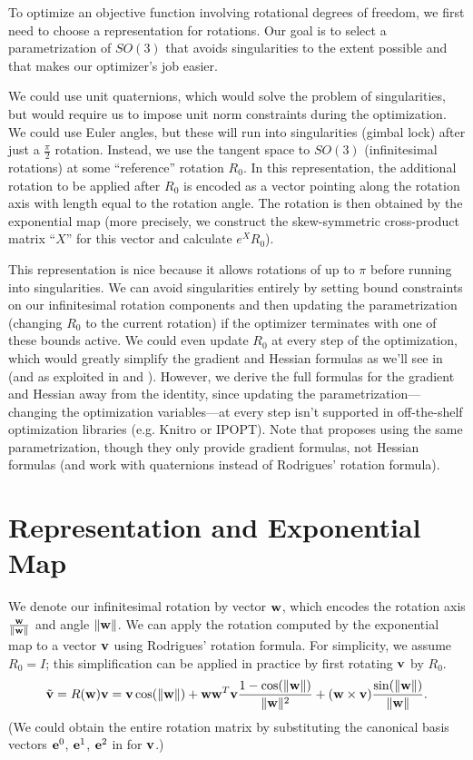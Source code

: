 \documentclass[10pt]{article}
\title{\documenttitle}
\author{Julian Panetta}
\providecommand{\norm}[1]{\lVert#1\rVert}
\providecommand{\cross}{\times}
\renewcommand{\vec}[1]{{\bf #1}}
\newcommand\pr[1]{\prettyref{#1}}
\def\w{\vec{w}}
\def\wn{\norm{\w}}
\def\v{\vec{v}}
\def\e{\vec{e}}
\begin{document}
\maketitle

To optimize an objective function involving rotational
degrees of freedom, we first need to choose a representation for rotations.
Our goal is to select a parametrization of $SO(3)$ that avoids
singularities to the extent possible and that makes our optimizer's job easier.

We could use unit quaternions, which would solve the problem
of singularities, but would require us to impose unit norm constraints during the optimization. We could
use Euler angles, but these will run into singularities (gimbal lock) after just
a $\frac{\pi}{2}$ rotation. Instead, we use the tangent space to $SO(3)$
(infinitesimal rotations) at some ``reference'' rotation $R_0$. In this representation, the additional
rotation to be applied after  $R_0$ is encoded as a vector pointing along the
rotation axis with length equal to the rotation angle. The rotation is then
obtained by the exponential map (more precisely, we construct the skew-symmetric cross-product matrix ``$X$'' for this
vector and calculate $e^X R_0$).

This representation is nice because it allows rotations of up to $\pi$ before
running into singularities. We can avoid singularities entirely by setting bound
constraints on our infinitesimal rotation components and then updating the
parametrization (changing $R_0$ to the current rotation) if the optimizer
terminates with one of these bounds active. We could even update $R_0$
at every step of the optimization, which would greatly
simplify the gradient and Hessian formulas as we'll see in \pr{sec:around_identity}
(and as exploited
in \cite{kugelstadt2018fast} and \cite{taylor1994minimization}). However, we
derive the full formulas for the gradient and Hessian away from the identity, since
updating the parametrization---changing the optimization variables---at every
step isn't supported in off-the-shelf optimization libraries (e.g. Knitro or
IPOPT). Note that \cite{grassia1998practical} proposes using the same
parametrization, though they only provide gradient formulas, not Hessian
formulas (and work with quaternions instead of Rodrigues' rotation formula).

\section{Representation and Exponential Map}
We denote our infinitesimal rotation by vector $\w$, which encodes the rotation axis $\frac{\w}{\norm{\w}}$
and angle $\norm{\w}$.
We can apply the rotation computed by the exponential map to a vector $\v$ using Rodrigues' rotation formula.
For simplicity, we assume $R_0 = I$; this simplification can be applied in practice by first rotating $\v$ by $R_0$.
$$
\tilde{\v} = R(\w) \v =
        \v \cos(\wn) + \w \w^T \v \frac{1 - \cos(\wn)}{\wn^2} + (\w \cross \v) \frac{\sin(\wn)}{\wn}.
$$
(We could obtain the entire rotation matrix by substituting the canonical basis vectors $\e^0$,  $\e^1$,  $\e^2$ in for $\v$.)
\end{document}
